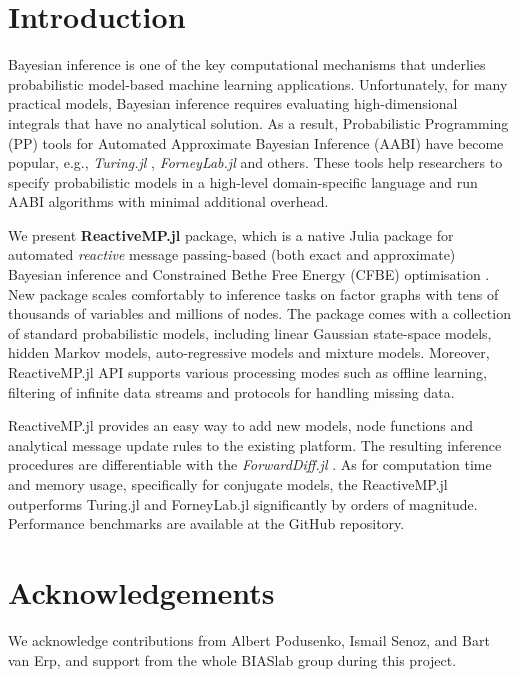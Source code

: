 \documentclass{juliacon}
\begin{document}


\maketitle

\begin{abstract}

This is a guide for authors who are preparing papers for JuliaCon using the \LaTeX{} document
preparation system and the \verb|juliacon|  class file.

\end{abstract}

\section{Introduction}

Bayesian inference is one of the key computational mechanisms that underlies probabilistic model-based machine learning applications. 
Unfortunately, for many practical models, Bayesian inference requires evaluating high-dimensional integrals that have no analytical solution. 
As a result, Probabilistic Programming (PP) tools for Automated Approximate Bayesian Inference (AABI) have become popular, e.g., \textit{Turing.jl} \cite{ge2018t}, 
\textit{ForneyLab.jl} \cite{ForneyLab.jl-2019} and others. These tools help researchers to specify probabilistic models in a high-level domain-specific language and 
run AABI algorithms with minimal additional overhead. 

We present \textbf{ReactiveMP.jl} package, which is a native Julia package for automated \textit{reactive} message passing-based (both exact and approximate) Bayesian inference and 
Constrained Bethe Free Energy (CFBE) optimisation \cite{senoz_local_constraint_2021}. New package scales comfortably to inference tasks on factor graphs with tens of thousands of variables and millions of nodes. 
The package comes with a collection of standard probabilistic models, including linear Gaussian state-space models, hidden Markov models, auto-regressive models and mixture models. 
Moreover, ReactiveMP.jl API supports various processing modes such as offline learning, filtering of infinite data streams and protocols for handling missing data.

ReactiveMP.jl provides an easy way to add new models, node functions and analytical message update rules to the existing platform. 
The resulting inference procedures are differentiable with the \textit{ForwardDiff.jl} \cite{RevelsLubinPapamarkou2016}. As for computation time and memory usage, specifically for conjugate models, 
the ReactiveMP.jl outperforms Turing.jl and ForneyLab.jl significantly by orders of magnitude. Performance benchmarks are available at the GitHub repository.

\section{Acknowledgements}

We acknowledge contributions from Albert Podusenko, Ismail Senoz, and Bart van Erp, and support from the whole BIASlab group during this project.


\end{document}
